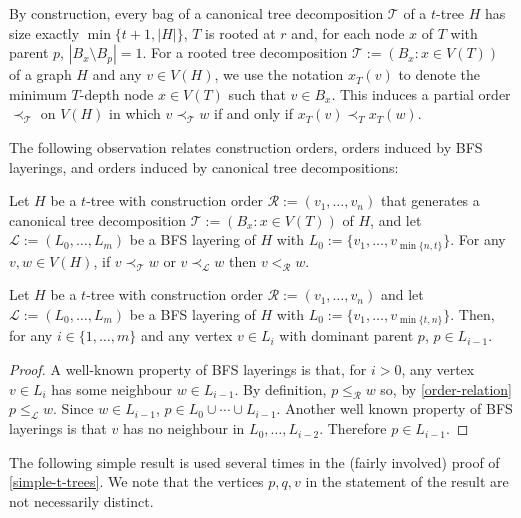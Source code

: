 \documentclass[kpfonts]{patmorin}
\theoremstyle{named}
\begin{document}
By construction, every bag of a canonical tree decomposition $\mathcal{T}$ of a $t$-tree $H$ has size exactly $\min\{t+1,|H|\}$, $T$ is rooted at $r$ and, for each node $x$ of $T$ with parent $p$, $|B_x\setminus B_p|=1$.
For a rooted tree decomposition $\mathcal{T}:=(B_x:x\in V(T))$ of a graph $H$ and any $v\in V(H)$, we use the notation $x_T(v)$ to denote the minimum $T$-depth node $x\in V(T)$ such that $v\in B_x$.  This induces a partial order $\prec_{\mathcal{T}}$ on $V(H)$ in which $v\prec_{\mathcal{T}} w$ if and only if $x_T(v)\prec_T x_T(w)$.

The following observation relates construction orders, orders induced by BFS layerings, and orders induced by canonical tree decompositions:

\begin{obs}\label{order-relation}
    Let $H$ be a $t$-tree with construction order $\mathcal{R}:=(v_1,\ldots,v_n)$ that generates a canonical tree decomposition $\mathcal{T}:=(B_x:x\in V(T))$ of $H$, and let $\mathcal{L}:=(L_0,\ldots,L_m)$ be a BFS layering of $H$ with $L_0:=\{v_1,\ldots,v_{\min\{n,t\}}\}$.  For any $v,w\in V(H)$,
    if $v\prec_{\mathcal{T}} w$ or $v\prec_{\mathcal{L}} w$ then $v<_{\mathcal{R}} w$.
\end{obs}

\begin{obs}\label{dominant-parent}
    Let $H$ be a $t$-tree with construction order $\mathcal{R}:=(v_1,\ldots,v_n)$ and let $\mathcal{L}:=(L_0,\ldots,L_m)$ be a BFS layering of $H$ with $L_0:=\{v_1,\ldots,v_{\min\{t,n\}}\}$.  Then, for any $i\in\{1,\ldots,m\}$ and any vertex $v\in L_{i}$ with dominant parent $p$, $p\in L_{i-1}$.
\end{obs}

\begin{proof}
    A well-known property of BFS layerings is that, for $i>0$, any vertex $v\in L_{i}$ has some neighbour $w\in L_{i-1}$.  By definition, $p\le_\mathcal{R} w$ so, by \cref{order-relation} $p\le_\mathcal{L} w$. Since $w\in L_{i-1}$, $p\in L_0\cup\cdots\cup L_{i-1}$.  Another well known property of BFS layerings is that $v$ has no neighbour in $L_0,\ldots,L_{i-2}$.  Therefore $p\in L_{i-1}$.
\end{proof}

The following simple result is used several times in the (fairly involved) proof of \cref{simple-t-trees}.  We note that the vertices $p,q,v$ in the statement of the result are not necessarily distinct.
\end{document}
